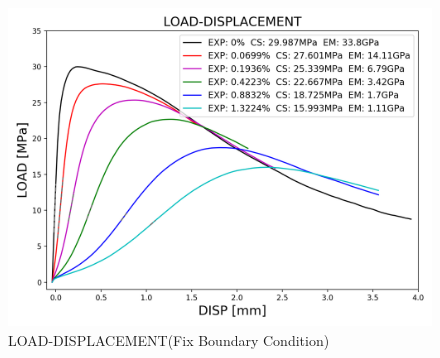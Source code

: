 
\begin{figure}[ht!]
    \centering
    \includegraphics[width=0.8\linewidth]{Files/exp_3D/ASR/S13A30P75FIX-LOAD-DISPLACEMENT.png}
    \caption{LOAD-DISPLACEMENT(Fix Boundary Condition)}
    \label{fig:S13A30P75FIX-LOAD-DISPLACEMENT}
\end{figure}


